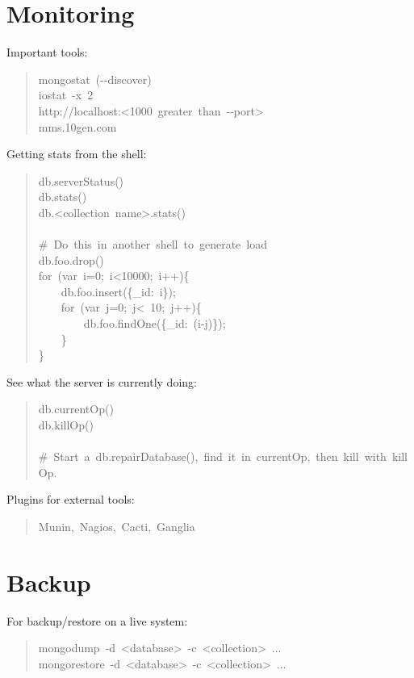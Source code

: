 \documentclass[letter]{article}
\begin{document}
\section{Monitoring%
  \label{monitoring}%
}

Important tools:
%
\begin{quote}{\ttfamily \raggedright \noindent
mongostat~(-{}-discover)\\
iostat~-x~2\\
http://localhost:<1000~greater~than~-{}-port>\\
mms.10gen.com
}
\end{quote}

Getting stats from the shell:
%
\begin{quote}{\ttfamily \raggedright \noindent
db.serverStatus()\\
db.stats()\\
db.<collection~name>.stats()\\
~\\
\#~Do~this~in~another~shell~to~generate~load\\
db.foo.drop()\\
for~(var~i=0;~i<10000;~i++)\{\\
~~~~db.foo.insert(\{\_id:~i\});\\
~~~~for~(var~j=0;~j<~10;~j++)\{\\
~~~~~~~~db.foo.findOne(\{\_id:~(i-j)\});\\
~~~~\}\\
\}
}
\end{quote}

See what the server is currently doing:
%
\begin{quote}{\ttfamily \raggedright \noindent
db.currentOp()\\
db.killOp()\\
~\\
\#~Start~a~db.repairDatabase(),~find~it~in~currentOp,~then~kill~with~killOp.
}
\end{quote}

Plugins for external tools:
%
\begin{quote}{\ttfamily \raggedright \noindent
Munin,~Nagios,~Cacti,~Ganglia
}
\end{quote}


\section{Backup%
  \label{backup}%
}

For backup/restore on a live system:
%
\begin{quote}{\ttfamily \raggedright \noindent
mongodump~-d~<database>~-c~<collection>~...\\
mongorestore~-d~<database>~-c~<collection>~...
}
\end{quote}
\end{document}
